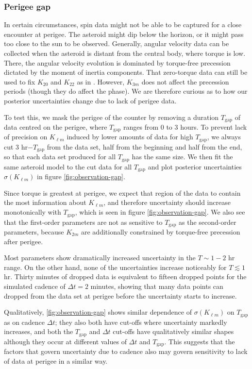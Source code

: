\documentclass[fleqn,usenatbib]{mnras}
\begin{document}
\subsubsection{Perigee gap}
\label{sec:scan-gap}
In certain circumstances, spin data might not be able to be captured for a close encounter at perigee. The asteroid might dip below the horizon, or it might pass too close to the sun to be observed. Generally, angular velocity data can be collected when the asteroid is distant from the central body, where torque is low. There, the angular velocity evolution is dominated by torque-free precession dictated by the moment of inertia components. That zero-torque data can still be used to fix $K_{20}$ and $K_{22}$ as in \cite{MOSKOVITZ2020113519}. However, $K_{3m}$ does not affect the precession periods (though they do affect the phase). We are therefore curious as to how our posterior uncertainties change due to lack of perigee data.

To test this, we mask the perigee of the counter by removing a duration $T_\text{gap}$ of data centred on the perigee, where $T_\text{gap}$ ranges from 0 to 3 hours. To prevent lack of precision on $K_{\ell m}$ induced by lower amounts of data for high $T_\text{gap}$, we always cut 3 hr$-T_\text{gap}$ from the data set, half from the beginning and half from the end, so that each data set produced for all $T_\text{gap}$ has the same size. We then fit the same asteroid model to the cut data for all $T_\text{gap}$ and plot posterior uncertainties $\sigma(K_{\ell m})$ in figure \ref{fig:observation-gap}.

Since torque is greatest at perigee, we expect that region of the data to contain the most information about $K_{\ell m}$, and therefore uncertainty should increase monotonically with $T_\text{gap}$, which is seen in figure \ref{fig:observation-gap}. We also see that the first-order parameters are not as sensitive to $T_\text{gap}$ as the second-order parameters, because $K_{2m}$ are additionally constrained by torque-free precession after perigee.

Most parameters show dramatically increased uncertainty in the $T \sim 1-2$ hr range. On the other hand, none of the uncertainties increase noticeably for $T \lesssim 1$ hr. Thirty minutes of dropped data is equivalent to fifteen dropped points for the simulated cadence of $\Delta t = 2$ minutes, showing that many data points can dropped from the data set at perigee before the uncertainty starts to increase.

Qualitatively, \ref{fig:observation-gap} shows similar dependence of $\sigma(K_{\ell m})$ on $T_\text{gap}$ as on cadence $\Delta t$; they also both have cut-offs where uncertainty markedly increases, and both the $T_\text{gap}$ and $\Delta t$ cut-offs have qualitatively similar shapes although they occur at different values of $\Delta t$ and $T_\text{gap}$. This suggests that the factors that govern uncertainty due to cadence also may govern sensitivity to lack of data at perigee in a similar way.
\end{document}
